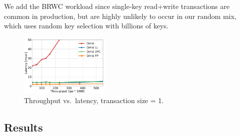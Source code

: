 We add the BRWC workload since single-key read+write transactions are common in production, but are highly unlikely to 
occur in our random mix, which uses random key selection with billions of keys.

\begin{figure}[ht]
	\centering
      	\includegraphics[width=0.38\textwidth]{figs/throughputlatency1.pdf}
      	\vspace{-0.3cm}
	    \caption{\small Throughput vs.\ latency, transaction size = 1.}
	    \vspace{-0.5cm}
        \label{fig:tl-1}      
\end{figure}


\subsection{Results}
\label{ssec:results}

